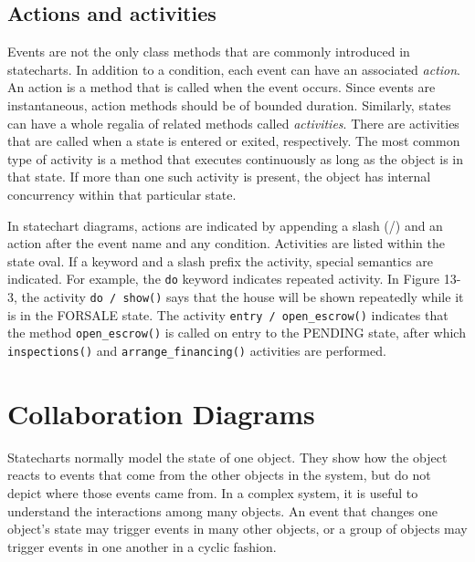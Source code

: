 \subsection*{Actions and activities}

Events are not the only class methods that are commonly introduced in
statecharts. In addition to a condition, each event can have an
associated \textit{action}. An action is a
method that is called when the event occurs. Since events are
instantaneous, action methods should be of bounded duration.
Similarly, states can have a whole regalia of related methods called
\textit{activities}. There are activities
that are called when a state is entered or exited, respectively. The
most common type of activity is a method that executes continuously as
long as the object is in that state. If more than one such activity is
present, the object has internal concurrency within that particular
state.

In statechart diagrams, actions are indicated by appending a slash (/)
and an action after the event name and any
condition. Activities are listed within the state
oval. If a keyword and a slash prefix the activity, special semantics
are indicated. For example, the \texttt{do} keyword indicates
repeated activity. In Figure 13-3, the activity
\texttt{do / show()} says that the house will be shown repeatedly
while it is in the FORSALE state. The activity \texttt{entry /
open\_escrow()} indicates that the method \texttt{open\_escrow()} is
called on entry to the PENDING state, after which
\texttt{inspections()} and \texttt{arrange\_financing()} activities are
performed.

\section{Collaboration Diagrams}

Statecharts normally model the state of one
object. They show how the object reacts to events that come from the
other objects in the system, but do not depict where those events came
from. In a complex system, it is useful to understand
the interactions among many objects. An event that changes one
object's state may trigger events in many other
objects, or a group of objects may trigger events in one another in a
cyclic fashion.

